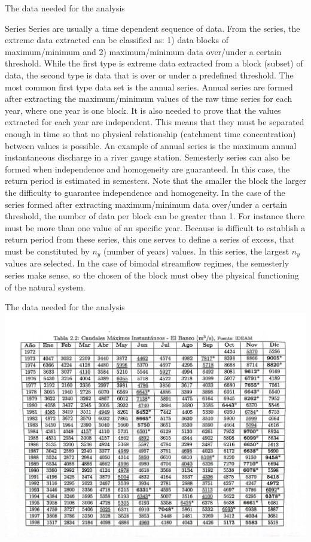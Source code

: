 \documentclass[8pt]{beamer}
\renewcommand{\emph}[1]{\textcolor{myorange}{#1}}
\begin{document}
\begin{frame}{The data needed for the analysis}
    \begin{block}{Series}
    \alert{Series} are usually a time dependent sequence of data. From the series, the extreme data extracted can be classified as: 1) \emph{data blocks of maximum/minimum} and 2) \emph{maximum/minimum data over/under a certain threshold}. While the first type is extreme data extracted from a block (subset) of data, the second type is data that is over or under a predefined threshold. The most common first type data set is the \emph{annual series}. Annual series are formed after extracting the  maximum/minimum values of the raw time series for each year, where one year is one block. It is also needed to prove that the values extracted for each year are independent. This means that they must be separated enough in time so that no physical relationship (catchment time concentration) between values is possible.  An example of annual series is the maximum annual instantaneous discharge in a river gauge station. Semesterly series can also be formed when independence and homogeneity are guaranteed. In this case, the return period is estimated in semesters. Note that the smaller the block the larger the difficulty to guarantee independence and homogeneity. 
    In the case of the series formed after extracting maximum/minimum data over/under a certain threshold, the number of data per block can be greater than 1. For instance there must be more than one value of an specific year. Because is difficult to establish a return period from these series, this one serves to define a series of excess, that must be constituted by $n_y$ (number of years) values. In this series, the largest $n_y$ values are selected. In the case of \emph{bimodal} streamflow regimes, the semesterly series make sense, so the chosen of the block must obey the physical functioning of the natural system. 
    \end{block}
\end{frame}

\begin{frame}{The data needed for the analysis}
\centering
\includegraphics[width=\linewidth]{taM22.jpg}  %
\end{frame}
\end{document}
